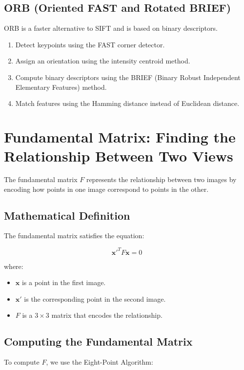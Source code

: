 \documentclass{article}
\begin{document}
\subsection{ORB (Oriented FAST and Rotated BRIEF)}
ORB is a faster alternative to SIFT and is based on binary descriptors.

\begin{enumerate}
    \item Detect keypoints using the FAST corner detector.
    \item Assign an orientation using the intensity centroid method.
    \item Compute binary descriptors using the BRIEF (Binary Robust Independent Elementary Features) method.
    \item Match features using the Hamming distance instead of Euclidean distance.
\end{enumerate}

\section{Fundamental Matrix: Finding the Relationship Between Two Views}
The fundamental matrix \( F \) represents the relationship between two images by encoding how points in one image correspond to points in the other.

\subsection{Mathematical Definition}
The fundamental matrix satisfies the equation:

\begin{equation}
    \mathbf{x'}^T F \mathbf{x} = 0
\end{equation}

where:
\begin{itemize}
    \item \( \mathbf{x} \) is a point in the first image.
    \item \( \mathbf{x'} \) is the corresponding point in the second image.
    \item \( F \) is a \( 3 \times 3 \) matrix that encodes the relationship.
\end{itemize}

\subsection{Computing the Fundamental Matrix}
To compute \( F \), we use the Eight-Point Algorithm:
\end{document}
